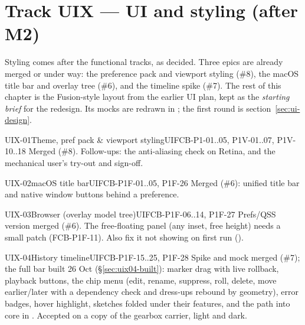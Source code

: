 \section{Track UIX --- UI and styling (after M2)}\label{sec:uix}

Styling comes after the functional tracks, as decided. Three epics are already merged or under way: the
preference pack and viewport styling (\#8), the macOS title bar and overlay tree (\#6), and the timeline
spike (\#7). The rest of this chapter is the Fusion-style layout from the earlier UI plan, kept as the
\emph{starting brief} for the redesign. Its mocks are redrawn in ; the first round is section~\ref{sec:ui-design}.

\begin{epic}{UIX-01}{Theme, pref pack \& viewport styling}{UI}{\stDone}{FCB-P1-01..05, P1V-01..07, P1V-10..18}
Merged (\#8). Follow-ups: the anti-aliasing check on Retina, and the mechanical user's try-out and sign-off.
\end{epic}
\begin{epic}{UIX-02}{macOS title bar}{UI}{\stDone}{FCB-P1F-01..05, P1F-26}
Merged (\#6): unified title bar and native window buttons behind a preference.
\end{epic}
\begin{epic}{UIX-03}{Browser (overlay model tree)}{UI}{\stProg}{FCB-P1F-06..14, P1F-27}
Prefs/QSS version merged (\#6). The free-floating panel (any inset, free height) needs a small
 patch (FCB-P1F-11). Also fix it not showing on first run ().
\end{epic}
\begin{epic}{UIX-04}{History timeline}{UI}{\stDone}{FCB-P1F-15..25, P1F-28}
Spike and mock merged (\#7); the full bar built 26 Oct (\S\ref{sec:uix04-built}): marker drag with live rollback,
playback buttons, the chip menu (edit, rename, suppress, roll, delete, move earlier/later with a dependency check
and dress-ups rebound by geometry), error badges, hover highlight, sketches folded under their features, and the
path into core in . Accepted on a copy of the gearbox carrier, light and dark.
\end{epic}

